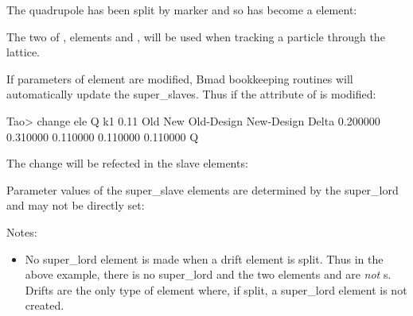 \documentclass{hitec}
\begin{document}
The quadrupole  has been split by marker  and so has become a  element:

The two  of , elements  and , will be used when tracking a
particle through the lattice.

If parameters of element  are modified, Bmad bookkeeping routines will automatically update the super_slaves.
Thus if the  attribute of  is modified:
\begin{code}
Tao> change ele Q k1 0.11
           Old           New    Old-Design    New-Design         Delta
      0.200000      0.310000      0.110000      0.110000      0.110000    Q
\end{code}

\newpage

The change will be refected in the slave elements:


Parameter values of the super_slave elements are determined by the super_lord and may not be directly set:

Notes:
\vspace{-10 pt}
\begin{itemize}
\item 
No super_lord element is made when a drift element is split. Thus in the above example, there is no
 super_lord and the two elements  and  are {\em not} s.
Drifts are the only type of element where, if split, a super_lord element is not created.
\end{itemize}
\end{document}
